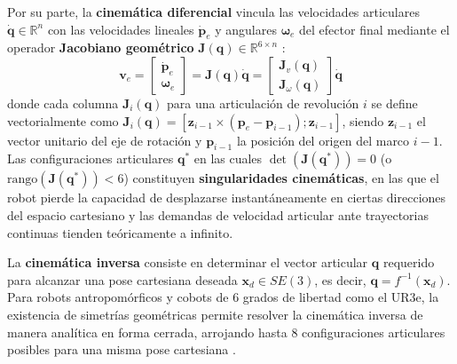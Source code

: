 \documentclass[12pt]{article}
\begin{document}
Por su parte, la \textbf{cinemática diferencial} vincula las velocidades articulares $\dot{\bm{q}} \in \mathbb{R}^n$ con las velocidades lineales $\dot{\bm{p}}_e$ y angulares $\bm{\omega}_e$ del efector final mediante el operador \textbf{Jacobiano geométrico} $\bm{J}(\bm{q}) \in \mathbb{R}^{6 \times n}$ \cite{modern_robotics}:
\begin{equation}
\bm{v}_e = \begin{bmatrix} \dot{\bm{p}}_e \\ \bm{\omega}_e \end{bmatrix} = \bm{J}(\bm{q})\dot{\bm{q}} = \begin{bmatrix} \bm{J}_v(\bm{q}) \\ \bm{J}_\omega(\bm{q}) \end{bmatrix} \dot{\bm{q}}
\label{eq:jacobiano_geometrico}
\end{equation}
donde cada columna $\bm{J}_i(\bm{q})$ para una articulación de revolución $i$ se define vectorialmente como $\bm{J}_i(\bm{q}) = [\bm{z}_{i-1} \times (\bm{p}_e - \bm{p}_{i-1}); \bm{z}_{i-1}]$, siendo $\bm{z}_{i-1}$ el vector unitario del eje de rotación y $\bm{p}_{i-1}$ la posición del origen del marco $i-1$. Las configuraciones articulares $\bm{q}^*$ en las cuales $\det(\bm{J}(\bm{q}^*)) = 0$ (o $\text{rango}(\bm{J}(\bm{q}^*)) < 6$) constituyen \textbf{singularidades cinemáticas}, en las que el robot pierde la capacidad de desplazarse instantáneamente en ciertas direcciones del espacio cartesiano y las demandas de velocidad articular ante trayectorias continuas tienden teóricamente a infinito.

La \textbf{cinemática inversa} consiste en determinar el vector articular $\bm{q}$ requerido para alcanzar una pose cartesiana deseada $\bm{x}_d \in SE(3)$, es decir, $\bm{q} = f^{-1}(\bm{x}_d)$. Para robots antropomórficos y cobots de 6 grados de libertad como el UR3e, la existencia de simetrías geométricas permite resolver la cinemática inversa de manera analítica en forma cerrada, arrojando hasta 8 configuraciones articulares posibles para una misma pose cartesiana \cite{craig2005introduction, modern_robotics}.
\end{document}

